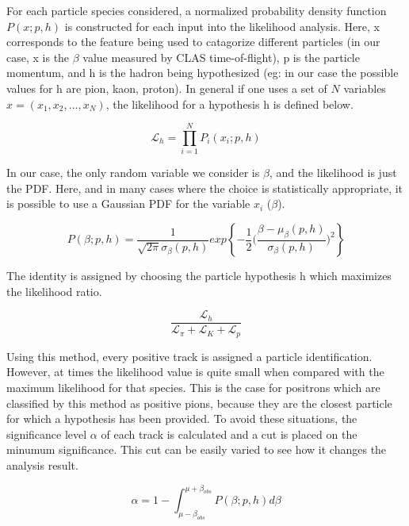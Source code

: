 For each particle species considered, a normalized probability density function $P(x;p,h)$ is constructed for each input into the likelihood analysis.  Here, x corresponds to the feature being used to catagorize different particles (in our case, x is the $\beta$ value measured by CLAS time-of-flight), p is the particle momentum, and h is the hadron being hypothesized (eg: in our case the possible values for h are pion, kaon, proton).  In general if one uses a set of $N$ variables $x = (x_1, x_2, ..., x_N)$, the likelihood for a hypothesis h is defined below.

\begin{equation}
  \mathcal{L}_h = \prod^{N}_{i=1} P_{i} (x_i; p, h)
\end{equation}

In our case, the only random variable we consider is $\beta$, and the likelihood is just the PDF.  Here, and in many cases where the choice is statistically appropriate, it is possible to use a Gaussian PDF for the variable $x_i$ ($\beta$).

\begin{equation}
  P(\beta;p,h) = \frac{1}{\sqrt{2 \pi} \sigma_\beta(p,h) } exp \left \{ -\frac{1}{2} \bigg( \frac{\beta - \mu_\beta(p,h)}{\sigma_\beta(p,h)} \bigg)^2 \right \}
\end{equation}

The identity is assigned by choosing the particle hypothesis h which maximizes the likelihood ratio.  
 
\begin{equation}
  \frac{\mathcal{L}_h}{\mathcal{L}_{\pi}+\mathcal{L}_{K}+\mathcal{L}_{p}}
\end{equation}

Using this method, every positive track is assigned a particle identification.  However, at times the likelihood value is quite small when compared with the maximum likelihood for that species.  This is the case for positrons which are classified by this method as positive pions, because they are the closest particle for which a hypothesis has been provided.  To avoid these situations, the significance level $\alpha$ of each track is calculated and a cut is placed on the minumum significance.  This cut can be easily varied to see how it changes the analysis result.

\begin{equation}
  \alpha = 1 - \int_{\mu-\beta_{obs}}^{\mu+\beta_{obs}} P(\beta;p,h) d\beta
\end{equation}

